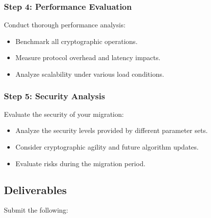 \documentclass[10pt,a4paper,american]{article}
\begin{document}
\subsubsection*{Step 4: Performance Evaluation}
Conduct thorough performance analysis:
\begin{itemize}
	\item Benchmark all cryptographic operations.
	\item Measure protocol overhead and latency impacts.
	\item Analyze scalability under various load conditions.
\end{itemize}

\subsubsection*{Step 5: Security Analysis}
Evaluate the security of your migration:
\begin{itemize}
	\item Analyze the security levels provided by different parameter sets.
	\item Consider cryptographic agility and future algorithm updates.
	\item Evaluate risks during the migration period.
\end{itemize}

\subsection*{Deliverables}
Submit the following:
\end{document}
